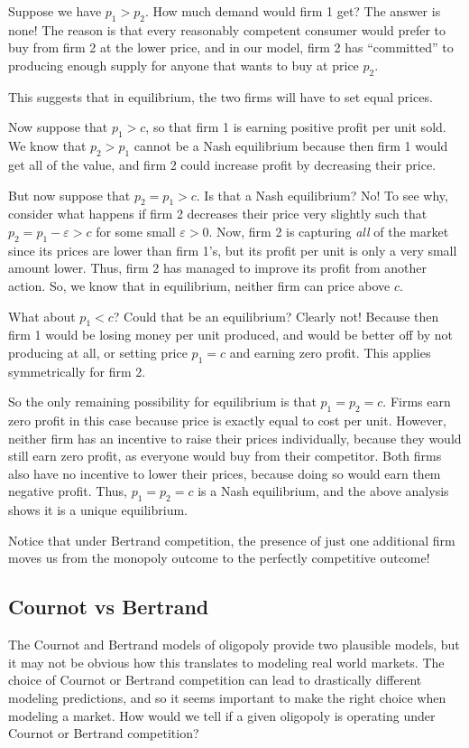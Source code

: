 Suppose we have $p_1 > p_2$. How much demand would firm 1 get? The answer is none! The reason is that every reasonably competent consumer would prefer to buy from firm 2 at the lower price, and in our model, firm 2 has ``committed'' to producing enough supply for anyone that wants to buy at price $p_2$.

This suggests that in equilibrium, the two firms will have to set equal prices. 

Now suppose that $p_1 > c$, so that firm 1 is earning positive profit per unit sold. We know that $p_2 > p_1$ cannot be a Nash equilibrium because then firm 1 would get all of the value, and firm 2 could increase profit by decreasing their price. 

But now suppose that $p_2 = p_1 > c$. Is that a Nash equilibrium? No! To see why, consider what happens if firm 2 decreases their price very slightly such that $p_2 = p_1 - \varepsilon > c$ for some small $\varepsilon > 0$. Now, firm 2 is capturing \emph{all} of the market since its prices are lower than firm 1's, but its profit per unit is only a very small amount lower. Thus, firm 2 has managed to improve its profit from another action. So, we know that in equilibrium, neither firm can price above $c$.

What about $p_1 < c$? Could that be an equilibrium? Clearly not! Because then firm 1 would be losing money per unit produced, and would be better off by not producing at all, or setting price $p_1 = c$ and earning zero profit. This applies symmetrically for firm 2.

So the only remaining possibility for equilibrium is that $p_1 = p_2 = c$. Firms earn zero profit in this case because price is exactly equal to cost per unit. However, neither firm has an incentive to raise their prices individually, because they would still earn zero profit, as everyone would buy from their competitor. Both firms also have no incentive to lower their prices, because doing so would earn them negative profit. Thus, $p_1 = p_2 = c$ is a Nash equilibrium, and the above analysis shows it is a unique equilibrium.

Notice that under Bertrand competition, the presence of just one additional firm moves us from the monopoly outcome to the perfectly competitive outcome! 

\subsection*{Cournot vs Bertrand}
The Cournot and Bertrand models of oligopoly provide two plausible models, but it may not be obvious how this translates to modeling real world markets. The choice of Cournot or Bertrand competition can lead to drastically different modeling predictions, and so it seems important to make the right choice when modeling a market. How would we tell if a given oligopoly is operating under Cournot or Bertrand competition? 

